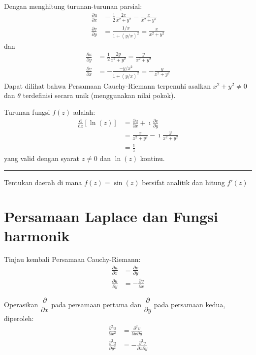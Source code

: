 Dengan menghitung turunan-turunan parsial:
\begin{align*}
\frac{\partial u}{\partial x} & = \frac{1}{2}\frac{2x}{x^{2}+y^{2}}=\frac{x}{x^{2}+y^{2}} \\
\frac{\partial v}{\partial y} & = \frac{1/x}{1+\left(y/x\right)^{2}}=\frac{x}{x^{2}+y^{2}}
\end{align*}
dan
\begin{align*}
\frac{\partial u}{\partial y} & =\frac{1}{2}\frac{2y}{x^{2}+y^{2}}=\frac{y}{x^{2}+y^{2}}\\
\frac{\partial v}{\partial x} & =-\frac{-y/x^{2}}{1+\left(y/x\right)^{2}}=-\frac{y}{x^{2}+y^{2}}
\end{align*}
%
Dapat dilihat bahwa Persamaan Cauchy-Riemann terpenuhi asalkan $x^{2}+y^{2}\neq0$
dan $\theta$ terdefinisi secara unik (menggunakan nilai pokok).

Turunan fungsi $f(z)$ adalah:
\begin{align*}
\frac{\mathrm{d}}{\mathrm{d}z}\left[\ln(z)\right] & =\frac{\partial u}{\partial x}+\imath\frac{\partial v}{\partial y}\\
 & =\frac{x}{x^{2}+y^{2}}-\imath\frac{y}{x^{2}+y^{2}}\\
 & =\frac{1}{z}
\end{align*}
yang valid dengan syarat $z\neq0$ dan $\ln(z)$ kontinu.

\rule[0.5ex]{1\columnwidth}{1pt}

{\color{blue}
Tentukan daerah di mana $f(z) = \sin(z)$ bersifat analitik dan hitung $f'(z)$
}


\section{Persamaan Laplace dan Fungsi harmonik}

Tinjau kembali Persamaan Cauchy-Riemann:
\begin{align*}
\frac{\partial u}{\partial x} & = \frac{\partial v}{\partial y} \\
\frac{\partial u}{\partial y} & = -\frac{\partial v}{\partial x}
\end{align*}

Operasikan $\dfrac{\partial}{\partial x}$ pada persamaan pertama
dan $\dfrac{\partial}{\partial y}$ pada persamaan kedua, diperoleh:
\begin{align*}
\frac{\partial^{2}u}{\partial x^{2}} &= \frac{\partial^{2}v}{\partial x\partial y} \\
\frac{\partial^{2}u}{\partial y^{2}} &= -\frac{\partial^{2}v}{\partial x\partial y}
\end{align*}

